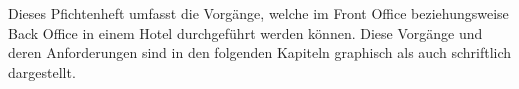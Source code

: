\documentclass[../../Pflichtenheft.tex]{subfiles}
\begin{document}
	Dieses Pfichtenheft umfasst die Vorgänge, welche im Front Office
	beziehungsweise Back Office in einem Hotel durchgeführt werden können.
	Diese Vorgänge und deren Anforderungen sind in den folgenden Kapiteln
	graphisch als auch schriftlich dargestellt.
\end{document}
